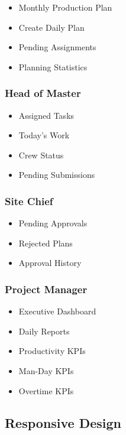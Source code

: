 \documentclass[11pt]{article}
\begin{document}
\begin{itemize}
    \item Monthly Production Plan
    \item Create Daily Plan
    \item Pending Assignments
    \item Planning Statistics
\end{itemize}

\subsubsection*{Head of Master}

\begin{itemize}
    \item Assigned Tasks
    \item Today's Work
    \item Crew Status
    \item Pending Submissions
\end{itemize}

\subsubsection*{Site Chief}

\begin{itemize}
    \item Pending Approvals
    \item Rejected Plans
    \item Approval History
\end{itemize}

\subsubsection*{Project Manager}

\begin{itemize}
    \item Executive Dashboard
    \item Daily Reports
    \item Productivity KPIs
    \item Man-Day KPIs
    \item Overtime KPIs
\end{itemize}

\subsection{Responsive Design}
\end{document}
